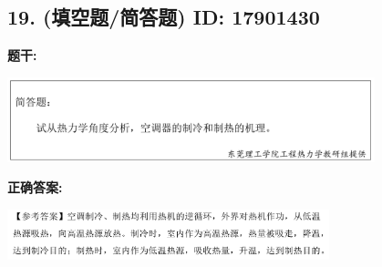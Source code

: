 \documentclass[12pt]{article}
\begin{document}
\vspace{0.5em}\hrulefill\vspace{1em}

\subsection*{19. (填空题/简答题) \small ID: 17901430}

\textbf{题干:}


\begin{center}\includegraphics[width=0.8\textwidth, height=0.25\textheight, keepaspectratio]{question_19_17901430/title_img_1.png}\end{center}

\textbf{正确答案:}

\begin{center}\includegraphics[width=0.7\textwidth, height=0.2\textheight, keepaspectratio]{question_19_17901430/correct_answer_1_img_1.png}\end{center}

\vspace{0.5em}\hrulefill\vspace{1em}
\end{document}

